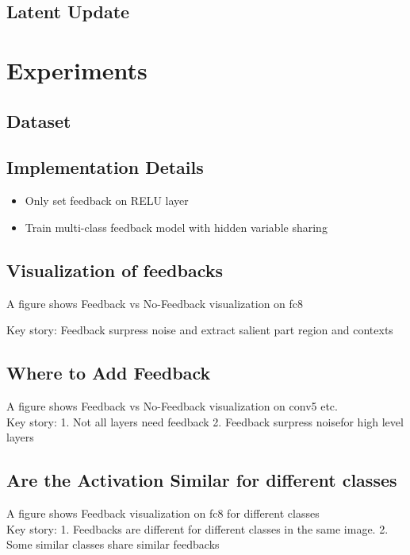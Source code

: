 \documentclass[10pt,twocolumn,letterpaper]{article}
\begin{document}
\subsection{Latent Update}

\section{Experiments}

\subsection{Dataset}

\subsection{Implementation Details}
\begin{itemize}
  \item Only set feedback on RELU layer 
  \item Train multi-class feedback model with hidden variable sharing
\end{itemize}

\subsection{Visualization of feedbacks}
A figure shows Feedback vs No-Feedback visualization on fc8

Key story: Feedback surpress noise and extract salient part region and contexts

\subsection{Where to Add Feedback}
A figure shows Feedback vs No-Feedback visualization on conv5 etc. \\

Key story: 1. Not all layers need feedback 2. Feedback surpress noisefor high level layers

\subsection{Are the Activation Similar for different classes}
A figure shows Feedback visualization on fc8 for different classes \\

Key story: 1. Feedbacks are different for different classes in the same image. 2. Some similar classes share similar feedbacks
\end{document}
